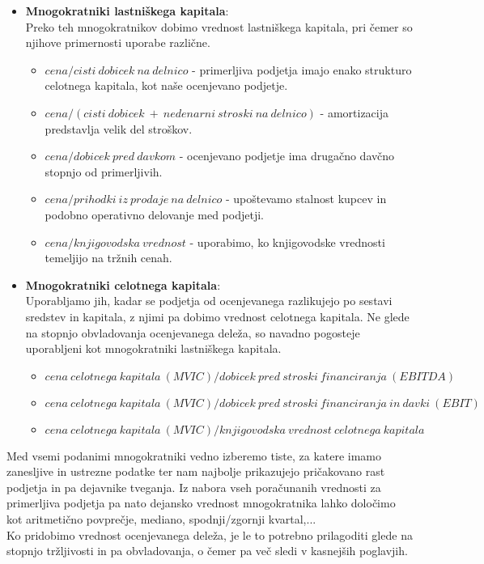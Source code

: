 \documentclass[12pt,a4paper]{amsart}
\theoremstyle{definition} %
\theoremstyle{plain} %
\begin{document}
\begin{itemize}
\item \textbf{Mnogokratniki lastniškega kapitala}:\\
Preko teh mnogokratnikov dobimo vrednost lastniškega kapitala, pri čemer so njihove primernosti uporabe različne. 
\begin{itemize}
\item $cena/cisti\ dobicek\ na\ delnico$ - primerljiva podjetja imajo enako strukturo celotnega kapitala, kot naše ocenjevano podjetje.
\item $cena/(cisti\ dobicek\ +\ nedenarni\ stroski\ na\ delnico)$ - amortizacija predstavlja velik del stroškov.
\item $cena/dobicek\ pred\ davkom$ - ocenjevano podjetje ima drugačno davčno stopnjo od primerljivih.
\item $cena/prihodki\ iz\ prodaje\ na\ delnico$ - upoštevamo stalnost kupcev in podobno operativno delovanje med podjetji.
\item $cena/knjigovodska\ vrednost$ - uporabimo, ko knjigovodske vrednosti temeljijo na tržnih cenah.
\end{itemize}
\item \textbf{Mnogokratniki celotnega kapitala}:\\
Uporabljamo jih, kadar se podjetja od ocenjevanega razlikujejo po sestavi sredstev in kapitala, z njimi pa dobimo vrednost celotnega kapitala. Ne glede na stopnjo obvladovanja ocenjevanega deleža, so navadno pogosteje uporabljeni kot mnogokratniki lastniškega kapitala.
\begin{itemize}
\item $cena\ celotnega\ kapitala\ (MVIC)/dobicek\ pred\ stroski\ financiranja\ (EBITDA)$
\item $cena\ celotnega\ kapitala\ (MVIC)/dobicek\ pred\ stroski\ financiranja\ in\ davki\ (EBIT)$
\item $cena\ celotnega\ kapitala\ (MVIC)/knjigovodska\ vrednost\ celotnega\ kapitala$
\end{itemize}
\end{itemize}
Med vsemi podanimi mnogokratniki vedno izberemo tiste, za katere imamo zanesljive in ustrezne podatke ter nam najbolje prikazujejo pričakovano rast podjetja in pa dejavnike tveganja. Iz nabora vseh poračunanih vrednosti za primerljiva podjetja pa nato dejansko vrednost mnogokratnika lahko določimo kot aritmetično povprečje, mediano, spodnji/zgornji kvartal,... \\
Ko pridobimo vrednost ocenjevanega deleža, je le to potrebno prilagoditi glede na stopnjo tržljivosti in pa obvladovanja, o čemer pa več sledi v kasnejših poglavjih.
\end{document}
